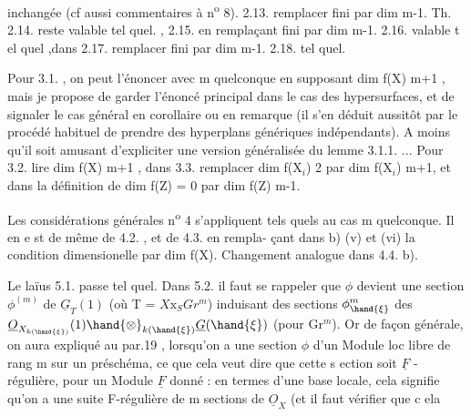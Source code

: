 
inchangée (cf aussi  commentaires à n\textsuperscript{o} 8). 2.13. remplacer fini
par dim \hand{$\leqslant$} m-1. Th. 2.14. reste valable tel quel. , 2.15. en
remplaçant fini par dim \hand{$\leqslant$} m-1. 2.16. valable t el quel ,dans
 2.17. remplacer fini par dim \hand{$\leqslant$} m-1. 2.18. tel quel.

Pour 3.1. , on peut l'énoncer avec m quelconque en supposant
dim f(X) \hand{$\geqslant$} m+1 , mais je propose de garder l'énoncé principal dans
le cas des hypersurfaces, et de signaler le cas général en corollaire
ou en remarque (il s'en déduit aussitôt par le procédé habituel de
prendre des hyperplans génériques indépendants). A moins qu'il soit
amusant d'expliciter une version généralisée du lemme 3.1.1. ...
Pour 3.2. lire dim f(X)\hand{$\geqslant$} m+1 , dans 3.3. remplacer dim f(X$_i$) \hand{$\geqslant$} 2
par dim f(X$_i$)\hand{$\geqslant$} m+1, et dans la définition de  dim f(Z) = 0
par dim f(Z) \hand{$\leqslant$} m-1.

Les considérations générales  n\textsuperscript{o} 4 s'appliquent tels quels
au cas m quelconque. Il en e st de même de 4.2. , et de 4.3. en rempla-%
çant dans b) (v) et (vi) la condition dimensionelle par
dim f(X). Changement analogue dans 4.4. b).

Le laïus 5.1. passe tel quel. Dans 5.2. il faut se rappeler
que $\phi$ devient une section $\phi^{(m)}$ de $\underline{G}_T(1)$ (où T 
 = $X\mathrm{x}_S Gr^m$)  induisant des sections
$\phi^m_{\hand{\xi}}$ des   $\underline{O}_{X_{k(\hand{\xi})}}(1)\hand{\otimes}_{k(\hand{\xi})}\underline{G}(\hand{\xi})$ (pour \hand{$\xi \in$} Gr$^m$). Or
de façon générale, on aura expliqué au par.19 , lorsqu'on a une
\margin{$\|$} section $\phi$ d'un Module loc libre de rang m sur un préschéma, ce que
\margin{$\|$} cela veut dire que cette s ection soit $\underline{F}$ -régulière, pour un Module
\margin{$\|$} $\underline{F}$ donné : en termes d'une base locale, cela signifie qu'on a une
\margin{$\|$} suite F-régulière de m sections de $\underline{O}_X$ (et il faut vérifier que c ela


